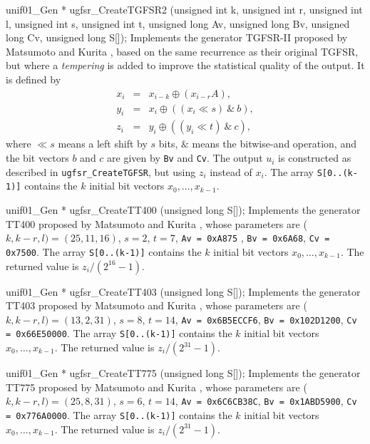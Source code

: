 unif01_Gen * ugfsr_CreateTGFSR2 (unsigned int k, unsigned int r,
                                 unsigned int l, unsigned int s,
                                 unsigned int t, unsigned long Av,
                                 unsigned long Bv, unsigned long Cv,
                                 unsigned long S[]);
\endcode
  \tab Implements the generator TGFSR-II proposed by
   Matsumoto and Kurita \cite{rMAT94a}, based on the same recurrence
   as their original TGFSR, but where a {\em tempering\/} is
   added to improve the statistical quality of the output.
   It is defined by
   \begin {eqnarray}
    x_i &=& x_{i-k} \oplus (x_{i-r}A),              \label {tgfsr2a} \\
    y_i &=& x_i \oplus ((x_i \ll s)\ \&\ b),          \label {tgfsr2b} \\
    z_i &=& y_i \oplus ((y_i \ll t)\ \&\ c),          \label {tgfsr2c}
   \end {eqnarray}
   where $\ll s$ means a left shift by $s$ bits,
   $\&$ means the bitwise-and operation, and the bit vectors
   $b$ and $c$ are given by {\tt Bv} and {\tt Cv}.
   The output $u_i$ is constructed as described in {\tt ugfsr\_CreateTGFSR},
   but using $z_i$ instead of $x_i$.
   The array {\tt S[0..(k-1)]} contains the $k$ initial bit vectors
   $x_0, \dots, x_{k-1}$.
  \endtab
\code


unif01_Gen * ugfsr_CreateTT400 (unsigned long S[]);
\endcode
  \tab Implements the generator TT400  proposed by
%
   Matsumoto and Kurita \cite{rMAT94a}, whose parameters are
   ($k,k-r,l) = (25,11,16)$,  $s = 2$, $t = 7$,
   {\tt Av = 0xA875} , {\tt Bv = 0x6A68}, {\tt Cv = 0x7500}.
   The array {\tt S[0..(k-1)]} contains the $k$ initial bit vectors
   $x_0, \dots, x_{k-1}$.   The returned value is $z_i/(2^{16} - 1)$.
  \endtab
\code


unif01_Gen * ugfsr_CreateTT403 (unsigned long S[]);
\endcode
  \tab Implements the generator TT403  proposed by
%
   Matsumoto and Kurita \cite{rMAT94a},  whose parameters are
   ($k,k-r,l) = (13,2,31)$,  $s = 8$, $t = 14$,
   {\tt Av = 0x6B5ECCF6}, {\tt Bv = 0x102D1200}, {\tt Cv = 0x66E50000}.
   The array {\tt S[0..(k-1)]} contains the $k$ initial bit vectors
   $x_0, \dots, x_{k-1}$.
   The returned value is $z_i/(2^{31} - 1)$.
  \endtab
\code


unif01_Gen * ugfsr_CreateTT775 (unsigned long S[]);
\endcode
  \tab Implements the generator TT775  proposed by
%
   Matsumoto and Kurita \cite{rMAT94a},  whose parameters are
   ($k,k-r,l) = (25,8,31)$,  $s = 6$, $t = 14$, {\tt Av = 0x6C6CB38C},
   {\tt Bv = 0x1ABD5900}, {\tt Cv = 0x776A0000}.
   The array {\tt S[0..(k-1)]} contains the $k$ initial bit vectors
   $x_0, \dots, x_{k-1}$.  The returned value is $z_i/(2^{31} - 1)$.
  \endtab
\code


